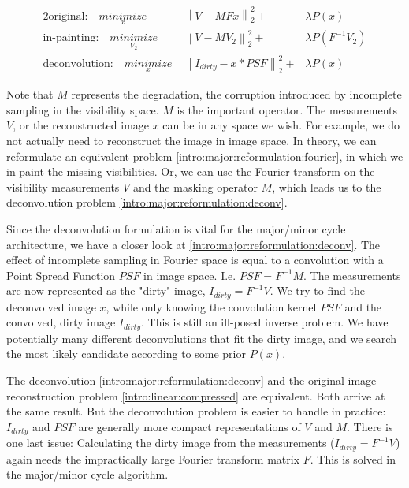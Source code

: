\begin{alignat}{2}
\text{original:} \quad \underset{x}{minimize}\:& \left \| V - M Fx \right \|_2^2 + &\lambda P(x) \label{intro:major:reformulation:factor}\\ 
\text{in-painting:} \quad\underset{V_2}{minimize}\:& \left \| V - M V_2 \right \|_2^2 + &\lambda P(F^{-1}V_2) \label{intro:major:reformulation:fourier} \\
\text{deconvolution:} \quad \underset{x}{minimize}\:& \left \| I_{dirty} - x * PSF \right \|_2^2 + &\lambda P(x) \label{intro:major:reformulation:deconv}
\end{alignat}

Note that $M$ represents the degradation, the corruption introduced by incomplete sampling in the visibility space. $M$ is the important operator. The measurements $V$, or the reconstructed image $x$ can be in any space we wish. For example, we do not actually need to reconstruct the image in image space. In theory, we can reformulate an equivalent problem \eqref{intro:major:reformulation:fourier}, in which we in-paint the missing visibilities. Or, we can use the Fourier transform on the visibility measurements $V$ and the masking operator $M$, which leads us to the deconvolution problem \eqref{intro:major:reformulation:deconv}. 

Since the deconvolution formulation is vital for the major/minor cycle architecture, we have a closer look at \eqref{intro:major:reformulation:deconv}. The effect of incomplete sampling in Fourier space is equal to a convolution with a Point Spread Function $PSF$ in image space. I.e. $PSF = F^{-1}M$. The measurements are now represented as the "dirty" image, $I_{dirty} = F^{-1}V$. We try to find the deconvolved image $x$, while only knowing the convolution kernel $PSF$ and the convolved, dirty image $I_{dirty}$. This is still an ill-posed inverse problem. We have potentially many different deconvolutions that fit the dirty image, and we search the most likely candidate according to some prior $P(x)$. 

The deconvolution \eqref{intro:major:reformulation:deconv} and the original image reconstruction problem \eqref{intro:linear:compressed} are equivalent. Both arrive at the same result. But the deconvolution problem is easier to handle in practice: $I_{dirty}$ and $PSF$ are generally more compact representations of $V$ and $M$. There is one last issue: Calculating the dirty image from the measurements ($I_{dirty} = F^{-1}V$) again needs the impractically large Fourier transform matrix $F$. This is solved in the major/minor cycle algorithm.

